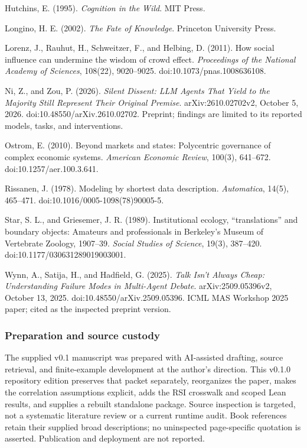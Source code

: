 \documentclass[
  10pt,
]{article}
\begin{document}
Hutchins, E. (1995). \emph{Cognition in the Wild}. MIT Press.

Longino, H. E. (2002). \emph{The Fate of Knowledge}. Princeton University Press.

Lorenz, J., Rauhut, H., Schweitzer, F., and Helbing, D. (2011). How social influence can undermine the wisdom of crowd effect. \emph{Proceedings of the National Academy of Sciences}, 108(22), 9020--9025. doi:10.1073/pnas.1008636108.

Ni, Z., and Zou, P. (2026). \emph{Silent Dissent: LLM Agents That Yield to the Majority Still Represent Their Original Premise}. arXiv:2610.02702v2, October 5, 2026. doi:10.48550/arXiv.2610.02702. Preprint; findings are limited to its reported models, tasks, and interventions.

Ostrom, E. (2010). Beyond markets and states: Polycentric governance of complex economic systems. \emph{American Economic Review}, 100(3), 641--672. doi:10.1257/aer.100.3.641.

Rissanen, J. (1978). Modeling by shortest data description. \emph{Automatica}, 14(5), 465--471. doi:10.1016/0005-1098(78)90005-5.

Star, S. L., and Griesemer, J. R. (1989). Institutional ecology, ``translations'' and boundary objects: Amateurs and professionals in Berkeley's Museum of Vertebrate Zoology, 1907--39. \emph{Social Studies of Science}, 19(3), 387--420. doi:10.1177/030631289019003001.

Wynn, A., Satija, H., and Hadfield, G. (2025). \emph{Talk Isn't Always Cheap: Understanding Failure Modes in Multi-Agent Debate}. arXiv:2509.05396v2, October 13, 2025. doi:10.48550/arXiv.2509.05396. ICML MAS Workshop 2025 paper; cited as the inspected preprint version.

\subsubsection{Preparation and source custody}\label{preparation-and-source-custody}

The supplied v0.1 manuscript was prepared with AI-assisted drafting, source retrieval, and finite-example development at the author's direction. This v0.1.0 repository edition preserves that packet separately, reorganizes the paper, makes the correlation assumptions explicit, adds the RSI crosswalk and scoped Lean results, and supplies a rebuilt standalone package. Source inspection is targeted, not a systematic literature review or a current runtime audit. Book references retain their supplied broad descriptions; no uninspected page-specific quotation is asserted. Publication and deployment are not reported.
\end{document}
